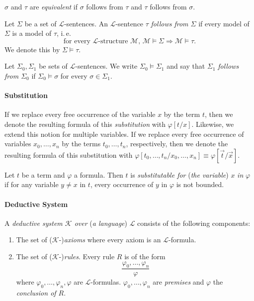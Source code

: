 $ \sigma $ and $\tau$ are \textit{equivalent} if $\sigma$ follows from $\tau$ and $\tau$ follows from $\sigma$. 


Let $\Sigma$ be a set of $\mathcal{L}$-sentences. An $\mathcal{L}$-sentence $\tau$ \textit{follows from $\Sigma$} if every model of $\Sigma$ is a model of $\tau$, i.\,e.\@
\[ \text{for every }\mathcal{L}\text{-structure }\mathcal{M}\text{, } \mathcal{M} \vDash \Sigma \Rightarrow \mathcal{M} \vDash \tau. \]
We denote this by $ \Sigma \vDash \tau$.

Let $\Sigma_0, \Sigma_1$ be sets of $\mathcal{L}$-sentences. We write $\Sigma_0 \vDash \Sigma_1$ and say that $\Sigma_1$ \textit{follows from $\Sigma_0$} if $\Sigma_0 \vDash \sigma$ for every $\sigma \in \Sigma_1$.

\paragraph{Substitution}
If we replace every free occurrence of the variable $x$ by the term $t$, then we denote the resulting formula of this \textit{substitution} with $\varphi[t/x]$. Likewise, we extend this notion for multiple variables. If we replace every free occurrence of variables $x_0, \ldots, x_n$ by the terms $t_0, \ldots, t_n$, respectively, then we denote the resulting formula of this substitution with $\varphi[t_0, \ldots, t_n / x_0, \ldots, x_n] \equiv \varphi[\overrightarrow{t}/\overrightarrow{x}]$.

Let $t$ be a term and $\varphi$ a formula. Then $t$ is \textit{substitutable for }(\textit{the variable}) $x$ \textit{in} $\varphi$ if for any variable $y \neq x$ in $t$, every occurrence of $y$ in $\varphi$ is not bounded. 


\paragraph{Deductive System}
A \textit{deductive system $\mathcal{K}$ over }(\textit{a language}) $\mathcal{L}$ consists of the following components:
\begin{enumerate}
\item The set of ($\mathcal{K}$-)\textit{axioms} where every axiom is an $\mathcal{L}$-formula.
\item The set of ($\mathcal{K}$-)\textit{rules}. Every rule $R$ is of the form 
\[\frac{\varphi_0, \ldots, \varphi_n}{\varphi}\] where $\varphi_0, \ldots, \varphi_n, \varphi$ are $\mathcal{L}$-formulas. $\varphi_0, \ldots, \varphi_n$ are \textit{premises} and $\varphi$ the \textit{conclusion of $R$}.
\end{enumerate}

